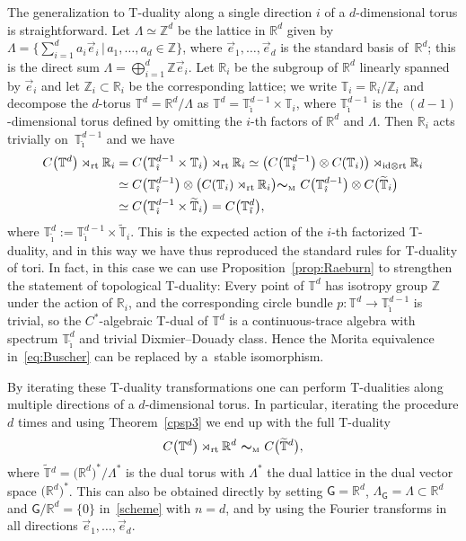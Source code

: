 \documentclass[10pt,a4paper]{amsart}
\numberwithin{equation}{section}
\def\nn{\nonumber}
\newcommand{\mbf}[1]{{\boldsymbol {#1} }}
\def\Id{{\rm id}}
\newcommand{\sfG}{\mathsf{G}}
\newcommand{\rt}{{\rm rt}}
\newcommand{\zed}{{\mathbb Z}} %
\newcommand{\real}{{\mathbb R}} %
\newcommand{\torus}{{\mathbb T}} %
\def\nn{\nonumber}
\begin{document}
The generalization to T-duality along a single direction $i$ of a
$d$-dimensional torus is
straightforward. Let $\Lambda\simeq\zed^d$ be the lattice in $\real^d$ given by
$\Lambda=\big\{\sum_{i=1}^d a_i \vec e_i \, | \, a_1,\dots,a_d \in
\zed\big\}$, where $\vec e_1,\dots,\vec e_d$ is the standard basis of~$\real^d$; this is the direct
sum $\Lambda=\bigoplus_{i=1}^d \zed\vec e_i$.
Let $\real_i$ be the subgroup of $\real^d$ linearly spanned by
$\vec e_i$ and let $\zed_i\subset\real_i$ be the corresponding
lattice; we write $\torus_i=\real_i/\zed_i$ and decompose the
$d$-torus $\torus^d=\real^d/\Lambda$ as
$\torus^d=\torus^{d-1}_{\hat\imath}\times\torus_i$, where
$\torus^{d-1}_{\hat\imath}$ is the $(d{-}1)$-dimensional torus defined by
omitting the $i$-th factors of $\real^d$ and $\Lambda$. Then $\real_i$
acts trivially on~$\torus^{d-1}_{\hat\imath}$ and we have
\begin{align}
C\big(\torus^d\big)\rtimes_\rt\real_i &=
C\big(\torus^{d-1}_{\hat\imath}\times \torus_{i}\big) \rtimes_\rt\real_i
\simeq \big(C\big(\torus^{d-1}_{\hat\imath}\big)\otimes
C(\torus_{i}) \big)\rtimes_{\Id\otimes\rt}\real_i\nn\\
&\simeq
C\big(\torus^{d-1}_{\hat\imath}\big)\otimes
\big(C(\torus_{i}) \rtimes_\rt\real_i \big)
 \mbf\sim_{\text{\tiny M}} \
C\big(\torus^{d-1}_{\hat\imath}\big)\otimes
C\big(\widetilde\torus_{i}\big) \nn\\
&\simeq
C\big(\torus^{d-1}_{\hat\imath}\times \widetilde\torus_{i}\big)
 = C\big(\torus^d_{\tilde\imath}\big) ,
\label{eq:Buscher}\end{align}
where $\torus^d_{\tilde\imath}:=\torus^{d-1}_{\hat\imath}\times
\widetilde\torus_{i}$.
This is the expected action of the $i$-th factorized T-duality, and in
this way we have thus
reproduced the standard rules for T-duality of tori. In fact, in this case we can use
Proposition~\ref{prop:Raeburn} to strengthen the statement of topological
T-duality: Every point of $\torus^d$ has isotropy group $\zed$ under
the action of $\real_i$, and the corresponding circle bundle
$p\colon \torus^d\to\torus^{d-1}_{\hat\imath}$ is trivial, so the
$C^*$-algebraic T-dual of $\torus^{d}$ is a continuous-trace algebra
with spectrum $\torus^d_{\tilde\imath}$ and trivial Dixmier--Douady
class. Hence the Morita equivalence in~\eqref{eq:Buscher} can be
replaced by a~stable isomorphism.

By iterating these T-duality transformations
one can perform T-dualities along multiple directions of a
$d$-dimensional torus. In particular, iterating the procedure $d$
times and using Theorem~\ref{cpsp3} we end up with the full T-duality
\begin{gather}\label{eq:fullTduality}
C\big(\torus^d\big)\rtimes_\rt\real^d \ \mbf\sim_{\text{\tiny M}} \
C\big(\widetilde\torus{}^d\big) ,
\end{gather}
where $\widetilde\torus{}^d=\big(\real^d\big)^*/\Lambda^*$ is the dual
torus with $\Lambda^*$ the dual lattice in the dual vector space $\big(\real^d\big)^*$.
This can also be obtained directly by setting $\sfG
=\real^d$, $\Lambda_\sfG=\Lambda\subset
\real^d$ and $\sfG/\real^d=\{0\}$ in~\eqref{scheme} with $n=d$, and by using the Fourier transforms in
all directions $\vec e_1,\dots,\vec e_d$.
\end{document}
